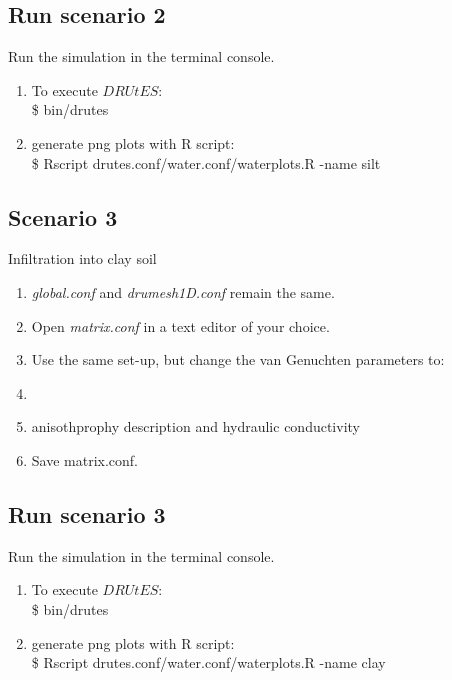 \subsection*{Run scenario 2}
Run the simulation in the terminal console.
\begin{enumerate}
\item To execute $DRUtES$: \\
\$ bin/drutes
\item generate png plots with R script: \\
\$ Rscript drutes.conf/water.conf/waterplots.R -name silt
\end{enumerate}

\subsection*{Scenario 3}
Infiltration into clay soil
\begin{enumerate}
\item \emph{global.conf} and \emph{drumesh1D.conf} remain the same.
\item Open \emph{matrix.conf} in a text editor of your choice. 
\item Use the same set-up, but change the van Genuchten parameters to:
\item {}
\item anisothprophy description and hydraulic conductivity\\ 
\item Save matrix.conf.
\end{enumerate}

\subsection*{Run scenario 3}
Run the simulation in the terminal console.
\begin{enumerate}
\item To execute $DRUtES$: \\
\$ bin/drutes
\item generate png plots with R script: \\
\$ Rscript drutes.conf/water.conf/waterplots.R -name clay
\end{enumerate}


